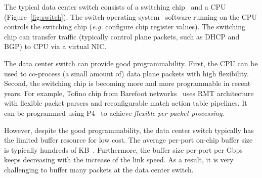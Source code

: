 
The typical data center switch consists of a switching chip~\cite{broadcom} and a CPU (Figure~\ref{fig:switch}).
The switch operating system~\cite{arista-eos} software running on the CPU controls the switching chip (\textit{e.g.} configure chip register values).
The switching chip can transfer traffic (typically control plane packets, such as DHCP and BGP) to CPU via a virtual NIC.

The data center switch can provide good programmability.
First, the CPU can be used to co-process (a small amount of) data plane packets with high flexibility\cite{lu2011serverswitch}.
Second, the switching chip is becoming more and more programmable in recent years.
For example, Tofino chip from Barefoot networks~\cite{tofino} uses RMT architecture~\cite{bosshart2013forwarding} with flexible packet parsers and reconfigurable match action table pipelines.
It can be programmed using P4~\cite{bosshart2014p4} to achieve \textit{flexible per-packet processing}.

However, despite the good programmability, the data center switch typically has the limited buffer resource for low cost.
The average per-port on-chip buffer size is typically hundreds of KB~\cite{bai2017congestion}.
Furthermore, the buffer size per port per Gbps keeps decreasing with the increase of the link speed.
As a result, it is very challenging to buffer many packets at the data center switch.
 




